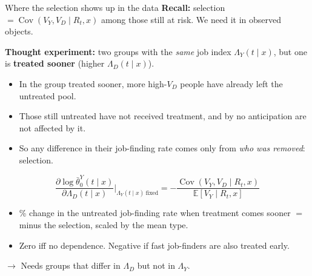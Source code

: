 \documentclass[aspectratio=169,10pt]{beamer}
\newcommand{\E}{\mathbb{E}}
\newcommand{\cov}{\operatorname{Cov}}
\begin{document}
\begin{frame}[label=m-sel]{Where the selection shows up in the data}
  \textbf{Recall:} selection $=\cov(V_Y,V_D\mid R_t,x)$ among those still at risk. We need it in observed objects.

  \medskip
  \textbf{Thought experiment:} two groups with the \emph{same} job index $\Lambda_Y(t\mid x)$, but one is \textbf{treated sooner} (higher $\Lambda_D(t\mid x)$).
  \begin{itemize}
    \item In the group treated sooner, more high-$V_D$ people have already left the untreated pool.
    \item Those still untreated have not received treatment, and by no anticipation are not affected by it.
    \item So any difference in their job-finding rate comes only from \emph{who was removed}: selection.
  \end{itemize}
  \[ \frac{\partial\log\bar\theta^Y_0(t\mid x)}{\partial\Lambda_D(t\mid x)}\bigg|_{\Lambda_Y(t\mid x)\ \text{fixed}} = -\frac{\cov(V_Y,V_D\mid R_t,x)}{\E[V_Y\mid R_t,x]} \]
  \begin{itemize}
    \item \% change in the untreated job-finding rate when treatment comes sooner $=$ minus the selection, scaled by the mean type.
    \item Zero iff no dependence. Negative if fast job-finders are also treated early.
  \end{itemize}
  $\rightarrow$ Needs groups that differ in $\Lambda_D$ but not in $\Lambda_Y$.
  \vfill\hfill\hyperlink{p-sel}{}
\end{frame}
\end{document}
